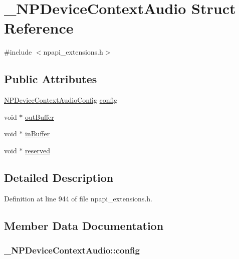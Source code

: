 \hypertarget{struct___n_p_device_context_audio}{
\section{\_\-NPDeviceContextAudio Struct Reference}
\label{struct___n_p_device_context_audio}
}


{\ttfamily \#include $<$npapi\_\-extensions.h$>$}

\subsection*{Public Attributes}
\begin{DoxyCompactItemize}
\item 
\hyperlink{struct___n_p_device_context_audio_config}{NPDeviceContextAudioConfig} \hyperlink{struct___n_p_device_context_audio_a77a64d9efc16465139b00f0939cebb71}{config}
\item 
void $\ast$ \hyperlink{struct___n_p_device_context_audio_a059607d2ba7cc02d5cdc10fc7e4b2b89}{outBuffer}
\item 
void $\ast$ \hyperlink{struct___n_p_device_context_audio_a8366d3cc305d9c97076ae202fa7eb4f3}{inBuffer}
\item 
void $\ast$ \hyperlink{struct___n_p_device_context_audio_a125bbc1c103ad897b7f2479d6ac34b6b}{reserved}
\end{DoxyCompactItemize}


\subsection{Detailed Description}


Definition at line 944 of file npapi\_\-extensions.h.



\subsection{Member Data Documentation}
\hypertarget{struct___n_p_device_context_audio_a77a64d9efc16465139b00f0939cebb71}{
\subsubsection[{config}]{ {\bf \_\-NPDeviceContextAudio::config}}}
\label{struct___n_p_device_context_audio_a77a64d9efc16465139b00f0939cebb71}


